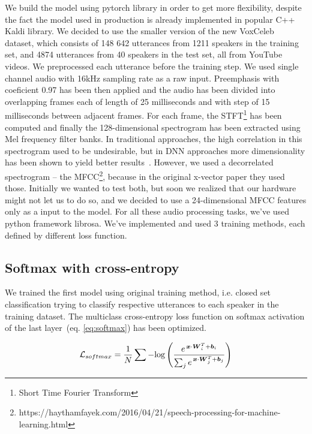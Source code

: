 We build the model using pytorch library in order to get more flexibility, despite the fact the model used in production is already implemented in popular C++ Kaldi library. We decided to use the smaller version of the new VoxCeleb~\cite{VoxCeleb} dataset, which consists of 148 642 utterances from 1211 speakers in the training set, and 4874 utterances from 40 speakers in the test set, all from YouTube videos. We preprocessed each utterance before the training step. We used single channel audio with 16kHz sampling rate as a raw input. Preemphasis with coeficient 0.97 has been then applied and the audio has been divided into overlapping frames each of length of 25 milliseconds and with step of 15 milliseconds between adjacent frames. For each frame, the STFT\footnote{Short Time Fourier Transform} has been computed and finally the 128-dimensional spectrogram has been extracted using Mel frequency filter banks. In traditional approaches, the high correlation in this spectrogram used to be undesirable, but in DNN approaches more dimensionality has been shown to yield better results~\cite{CNN_2016}. However, we used a decorrelated spectrogram -- the MFCC\footnote{https://haythamfayek.com/2016/04/21/speech-processing-for-machine-learning.html}, because in the original x-vector paper they used those. Initially we wanted to test both, but soon we realized that our hardware might not let us to do so, and we decided to use a 24-dimensional MFCC features only as a input to the model. For all these audio processing tasks, we've used python framework librosa. We've implemented and used 3 training methods, each defined by different loss function.

\subsection*{Softmax with cross-entropy}

We trained the first model using original training method, i.e. closed set classification trying to classify respective utterances to each speaker in the training dataset. The multiclass cross-entropy loss function on softmax activation of the last layer~(eq. \ref{eq:softmax}) has been optimized.

\begin{equation} \label{eq:softmax}
\mathcal{L}_{softmax} = \frac{1}{N} \sum - \textnormal{log} \left( 
\frac{e^{\,\boldsymbol{x} \cdot \boldsymbol{W}_i^T + \boldsymbol{b}_i}}
{\sum_{j} e^{\,\boldsymbol{x} \cdot \boldsymbol{W}_j^T + \boldsymbol{b}_j}} 
\right)
\end{equation}

